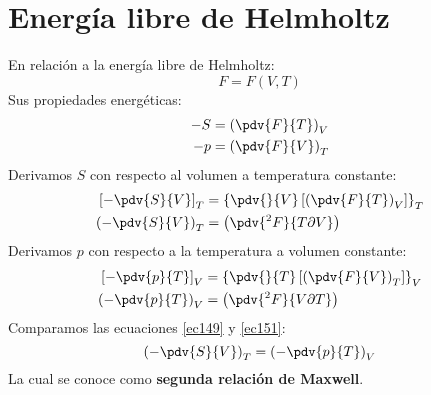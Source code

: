 \documentclass[../main]{subfiles}
\begin{document}
\section{Energía libre de Helmholtz}
En relación a la energía libre de Helmholtz:
\begin{equation}
    F=F(V,T)
\end{equation}
Sus propiedades energéticas:
\begin{align}
    -S & =\left( \pdv{F}{T} \right)_V \\
    -p & =\left( \pdv{F}{V}\right)_T
\end{align}
Derivamos $S$ con respecto al volumen a temperatura constante:
\begin{align}
    \left[- \pdv{S}{V}\right]_T & =\left\{ \pdv{}{V}\left[\left( \pdv{F}{T}\right)_V \right] \right\}_T \\
    \left( -\pdv{S}{V}\right)_T & =\left( \pdv{^2 F}{T \partial V}\right)
    \label{ec149}
\end{align}
Derivamos $p$ con respecto a la temperatura a volumen constante:
\begin{align}
    \left[- \pdv{p}{T}\right]_V & =\left\{ \pdv{}{T}\left[\left( \pdv{F}{V}\right)_T \right] \right\}_V \\
    \left( -\pdv{p}{T}\right)_V & =\left( \pdv{^2 F}{V \partial T}\right)
    \label{ec151}
\end{align}
Comparamos las ecuaciones \eqref{ec149} y \eqref{ec151}:
\begin{equation}
    \left( -\pdv{S}{V}\right)_T=\left( -\pdv{p}{T}\right)_V
\end{equation}
La cual se conoce como \textbf{segunda relación de Maxwell}.
\end{document}
